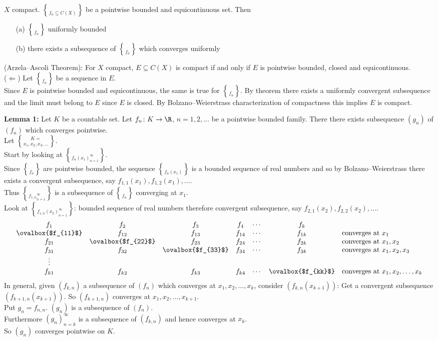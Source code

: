 \thm $X$ compact.  $\brace{f_n}\subseteq C(X)$ be a pointwise bounded and equicontinuous set.  Then
\begin{enumerate}
\item[(a)] $\brace{f_n}$ uniformly bounded
\item[(b)] there exists a subsequence of $\brace{f_n}$ which converges uniformly
\end{enumerate}
\cor (Arzela--Ascoli Theorem):  For $X$ compact, $E\subseteq C(X)$ is compact if and only if $E$ is pointwise bounded, closed and equicontinuous. \\
\pf ($\Longleftarrow$)  Let $\brace{f_n}$ be a sequence in $E$. \\
Since $E$ is pointwise bounded and equicontinuous, the same is true for $\brace{f_n}$.  By theorem there exists a uniformly convergent subsequence and the limit must belong to $E$ since $E$ is closed.  By Bolzano--Weierstrass characterization of compactness this implies $E$ is compact.

\textbf{Lemma 1: }Let $K$ be a countable set.  Let $f_n\colon K\to\R$, $n=1,2,\dotsc$ be a pointwise bounded family.  There there exists subsequence $(g_n)$ of $(f_n)$ which converges pointwise. \\
\pf Let $K=\brace{x_1,x_2,x_3,\dotsc}$. \\
Start by looking at $\brace{f_n(x_1)}_{n=1}^\infty$. \\
Since $\brace{f_n}$ are pointwise bounded, the sequence $\brace{f_n(x_1)}$ is a bounded sequence of real numbers and so by Bolzano--Weierstrass there exists a convergent subsequence, say $f_{1,1}(x_1),f_{1,2}(x_1),\dotsc$. \\
Thus $\brace{f_{1,n}}_{n=1}^\infty$ is a subsequence of $\brace{f_n}$ converging at $x_1$. \\
Look at $\brace{f_{1,n}(x_2)}_{n=1}^\infty$: bounded sequence of real numbers therefore convergent subsequence, say $f_{2,1}(x_2), f_{2,2}(x_2),\dotsc$.
\[ \begin{array}{ccccccl}
f_1 & f_2 & f_3 & f_4 & \cdots & f_k & \\
\ovalbox{$f_{11}$} & f_{12} & f_{13} & f_{14} & \cdots & f_{1k} & \text{converges at $x_1$} \\
f_{21} & \ovalbox{$f_{22}$} & f_{23} & f_{24} & \cdots & f_{2k} & \text{converges at $x_1,x_2$} \\
f_{31} & f_{32} & \ovalbox{$f_{33}$} & f_{34} & \cdots & f_{3k} & \text{converges at $x_1,x_2,x_3$} \\
\vdots \\
f_{k1} & f_{k2} & f_{k3} & f_{k4} & \cdots & \ovalbox{$f_{kk}$} & \text{converges at $x_1,x_2,\dotsc,x_k$}
\end{array} \]
In general, given $(f_{k,n})$ a subsequence of $(f_n)$ which converges at $x_1,x_2,\dotsc,x_k$, consider $(f_{k,n}(x_{k+1}))$: Get a convergent subsequence $(f_{k+1,n}(x_{k+1}))$.  So $(f_{k+1,n})$ converges at $x_1,x_2,\dotsc,x_{k+1}$. \\
Put $g_n=f_{n,n}$.  $(g_n)$ is a subsequence of $(f_n)$. \\
Furthermore $(g_n)_{n=k}^\infty$ is a subsequence of $(f_{k,n})$ and hence converges at $x_k$. \\
So $(g_n)$ converges pointwise on $K$.

